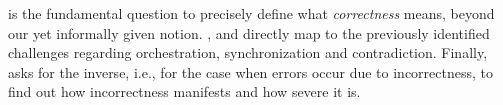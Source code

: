  is the fundamental question to precisely define what \emph{correctness} means, beyond our yet informally given notion.
,  and  directly map to the previously identified challenges regarding orchestration, synchronization and contradiction.
Finally,  asks for the inverse, i.e., for the case when errors occur due to incorrectness, to find out how incorrectness manifests and how severe it is.



